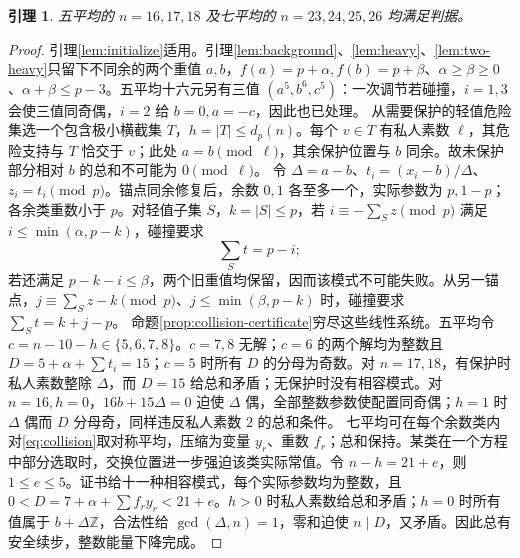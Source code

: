 \documentclass[11pt,a4paper]{article}
\newcommand{\Z}{\mathbb Z}
\newtheorem{lemma}[theorem]{引理}
\theoremstyle{definition}
\numberwithin{equation}{section}
\begin{document}
\begin{lemma}\label{lem:collision-small}
五平均的 $n=16,17,18$ 及七平均的 $n=23,24,25,26$ 均满足判据。
\end{lemma}
\begin{proof}
引理\ref{lem:initialize}适用。引理\ref{lem:background}、\ref{lem:heavy}、\ref{lem:two-heavy}只留下不同余的两个重值 $a,b$，$f(a)=p+\alpha,f(b)=p+\beta$、$\alpha\ge\beta\ge0$、$\alpha+\beta\le p-3$。五平均十六元另有三值 $(a^5,b^6,c^5)$：一次调节若碰撞，$i=1,3$ 会使三值同奇偶，$i=2$ 给 $b=0,a=-c$，因此也已处理。
从需要保护的轻值危险集选一个包含极小横截集 $T$，$h=|T|\le d_p(n)$。每个 $v\in T$ 有私人素数 $\ell$，其危险支持与 $T$ 恰交于 $v$；此处 $a=b\pmod\ell$，其余保护位置与 $b$ 同余。故未保护部分相对 $b$ 的总和不可能为 $0\pmod\ell$。
令 $\Delta=a-b$、$t_i=(x_i-b)/\Delta$、$z_i=t_i\pmod p$。锚点同余修复后，余数 $0,1$ 各至多一个，实际参数为 $p,1-p$；各余类重数小于 $p$。对轻值子集 $S$，$k=|S|\le p$，若 $i\equiv-\sum_{S}z\pmod p$ 满足 $i\le\min(\alpha,p-k)$，碰撞要求
\begin{equation}\label{eq:collision}
\sum_{S}t=p-i;
\end{equation}
若还满足 $p-k-i\le\beta$，两个旧重值均保留，因而该模式不可能失败。从另一锚点，$j\equiv\sum_S z-k\pmod p$、$j\le\min(\beta,p-k)$ 时，碰撞要求 $\sum_S t=k+j-p$。
命题\ref{prop:collision-certificate}穷尽这些线性系统。五平均令 $c=n-10-h\in\{5,6,7,8\}$。$c=7,8$ 无解；$c=6$ 的两个解均为整数且 $D=5+\alpha+\sum t_i=15$；$c=5$ 时所有 $D$ 的分母为奇数。对 $n=17,18$，有保护时私人素数整除 $\Delta$，而 $D=15$ 给总和矛盾；无保护时没有相容模式。对 $n=16,h=0$，$16b+15\Delta=0$ 迫使 $\Delta$ 偶，全部整数参数使配置同奇偶；$h=1$ 时 $\Delta$ 偶而 $D$ 分母奇，同样违反私人素数 $2$ 的总和条件。
七平均可在每个余数类内对\eqref{eq:collision}取对称平均，压缩为变量 $y_r$、重数 $f_r$；总和保持。某类在一个方程中部分选取时，交换位置进一步强迫该类实际常值。令 $n-h=21+e$，则 $1\le e\le5$。证书给十一种相容模式，每个实际参数均为整数，且 $0<D=7+\alpha+\sum f_ry_r<21+e$。$h>0$ 时私人素数给总和矛盾；$h=0$ 时所有值属于 $b+\Delta\Z$，合法性给 $\gcd(\Delta,n)=1$，零和迫使 $n\mid D$，又矛盾。因此总有安全续步，整数能量下降完成。
\end{proof}
\end{document}
